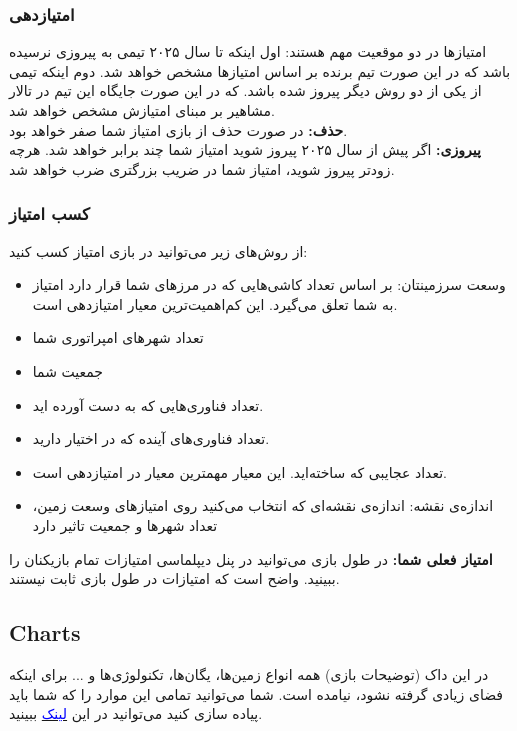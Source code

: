 \documentclass[]{article}
\begin{document}
\subsubsection*{{\titr امتیازدهی}}
امتیازها در دو موقعیت مهم هستند: اول اینکه تا سال ۲۰۲۵ تیمی به پیروزی نرسیده باشد که در این صورت تیم برنده بر اساس امتیازها مشخص خواهد شد. دوم اینکه تیمی از یکی از دو روش دیگر پیروز شده باشد. که در این صورت جایگاه این تیم در تالار مشاهیر بر مبنای امتیازش مشخص خواهد شد.
\\\noindent \textbf{حذف:} در صورت حذف از بازی امتیاز شما صفر خواهد بود.
\\\noindent \textbf{پیروزی:} اگر پیش از سال ۲۰۲۵ پیروز شوید امتیاز شما چند برابر خواهد شد. هرچه زودتر پیروز شوید، امتیاز شما در ضریب بزرگتری ضرب خواهد شد.

\subsubsection*{{\titr کسب امتیاز}}
از روش‌های زیر می‌توانید در بازی امتیاز کسب کنید:
\begin{itemize}
	\item وسعت سرزمینتان: بر اساس تعداد کاشی‌هایی که در مرزهای شما قرار دارد امتیاز به شما تعلق می‌گیرد. این کم‌اهمیت‌ترین معیار امتیازدهی است.
	\item تعداد شهرهای امپراتوری شما
	\item جمعیت شما
	\item تعداد فناوری‌هایی که به دست آورده اید.
	\item تعداد فناوری‌های آینده که در اختیار دارید.
	\item تعداد عجایبی که ساخته‌اید. این معیار مهمترین معیار در امتیازدهی است.
	\item اندازه‌ی نقشه: اندازه‌ی نقشه‌ای که انتخاب می‌کنید روی امتیازهای وسعت زمین، تعداد شهرها و جمعیت تاثیر دارد
\end{itemize}
\noindent \textbf{امتیاز فعلی شما:}  در طول بازی می‌توانید در پنل دیپلماسی امتیازات تمام بازیکنان را ببینید. واضح است که امتیازات در طول بازی ثابت نیستند.

\subsection*{{\titr Charts}}
در این داک (توضیحات بازی) همه انواع زمین‌ها، یگان‌ها، تکنولوژی‌ها و ... برای اینکه فضای زیادی گرفته نشود، نیامده است. شما می‌توانید تمامی این موارد را که شما باید پیاده سازی کنید می‌توانید در این 
 \href{https://docs.google.com/document/d/1nc7O3lcWN0OBdwXdwG6vOVuhLKdcxOnMXKr27-Cr8h8/edit?usp=sharing}{\textcolor{blue}{لینک}}
 ببینید.
\end{document}
